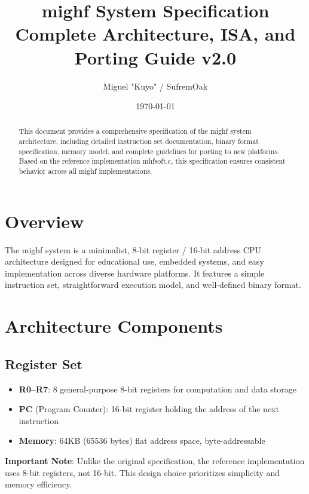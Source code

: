 \documentclass[a4paper,12pt]{article}
\title{mighf System Specification \\ \large Complete Architecture, ISA, and Porting Guide v2.0}
\author{Miguel "Kuyo" / SufremOak}
\date{\today}
\begin{document}
\maketitle

\begin{abstract}
This document provides a comprehensive specification of the mighf system architecture, including detailed instruction set documentation, binary format specification, memory model, and complete guidelines for porting to new platforms. Based on the reference implementation mhfsoft.c, this specification ensures consistent behavior across all mighf implementations.
\end{abstract}

\tableofcontents
\newpage

\section{Overview}
The mighf system is a minimalist, 8-bit register / 16-bit address CPU architecture designed for educational use, embedded systems, and easy implementation across diverse hardware platforms. It features a simple instruction set, straightforward execution model, and well-defined binary format.

\section{Architecture Components}

\subsection{Register Set}
\begin{itemize}
    \item \textbf{R0--R7}: 8 general-purpose 8-bit registers for computation and data storage
    \item \textbf{PC} (Program Counter): 16-bit register holding the address of the next instruction
    \item \textbf{Memory}: 64KB (65536 bytes) flat address space, byte-addressable
\end{itemize}

\textbf{Important Note}: Unlike the original specification, the reference implementation uses 8-bit registers, not 16-bit. This design choice prioritizes simplicity and memory efficiency.
\end{document}
